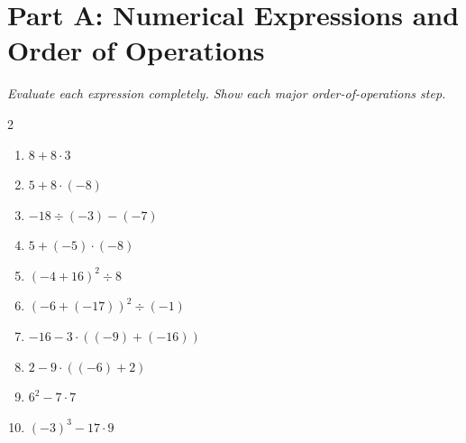 \documentclass[11pt]{article}
\begin{document}
\section*{Part A: Numerical Expressions and Order of Operations}
\noindent\textit{Evaluate each expression completely. Show each major order-of-operations step.}
\begin{multicols}{2}
\begin{enumerate}
  \item $8 + 8 \cdot 3$
  \vspace{1.1cm}
  \item $5 + 8 \cdot (-8)$
  \vspace{1.1cm}
  \item $-18 \div (-3) - (-7)$
  \vspace{1.1cm}
  \item $5 + (-5) \cdot (-8)$
  \vspace{1.1cm}
  \item $(-4 + 16)^{2} \div 8$
  \vspace{1.1cm}
  \item $(-6 + (-17))^{2} \div (-1)$
  \vspace{1.1cm}
  \item $-16 - 3 \cdot ((-9) + (-16))$
  \vspace{1.1cm}
  \item $2 - 9 \cdot ((-6) + 2)$
  \vspace{1.1cm}
  \item $6^{2} - 7 \cdot 7$
  \vspace{1.1cm}
  \item $(-3)^{3} - 17 \cdot 9$
  \vspace{1.1cm}
\end{enumerate}
\end{multicols}
\end{document}

